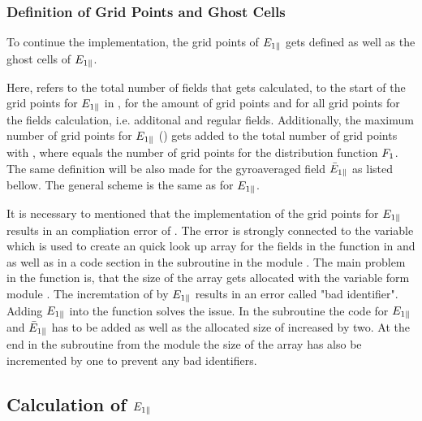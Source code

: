 \subsubsection*{Definition of Grid Points and Ghost Cells}

To continue the implementation, the grid points of $E_{1\parallel}$ gets defined as well as the ghost cells of $E_{1\parallel}$. 

Here,  refers to the total number of fields that gets calculated,  to the start of the grid points for $E_{1\parallel}$ in ,  for the amount of grid points and  for all grid points for the fields calculation, i.e. additonal and regular fields. Additionally, the maximum number of grid points for $E_{1\parallel}$ () gets added to the total number of grid points  with , where  equals the number of grid points for the distribution function $F_1$. The same definition will be also made for the gyroaveraged field $\bar{E}_{1\parallel}$ as listed bellow. The general scheme is the same as for $E_{1\parallel}$.

\bigskip

It is necessary to mentioned that the implementation of the grid points for $E_{1\parallel}$ results in an compliation error of {\gkw}. The error is strongly connected to the variable  which is used to create an quick look up array for the fields in the function  in  and  as well as in a code section in the subroutine  in the module . The main problem in the function  is, that the size of the array  gets allocated with the variable  form module . The incremtation of  by $E_{1\parallel}$ results in an {\gkw} error called "bad identifier". Adding $E_{1\parallel}$ into the function solves the issue. In the subroutine  the code for $E_{1\parallel}$ and $\bar{E}_{1\parallel}$ has to be added as well as the allocated size of  increased by two. At the end in the subroutine  from the module  the size of the array  has also be incremented by one to prevent any bad identifiers.

\newpage

\subsection*{Calculation of $E_{1\parallel}$}

